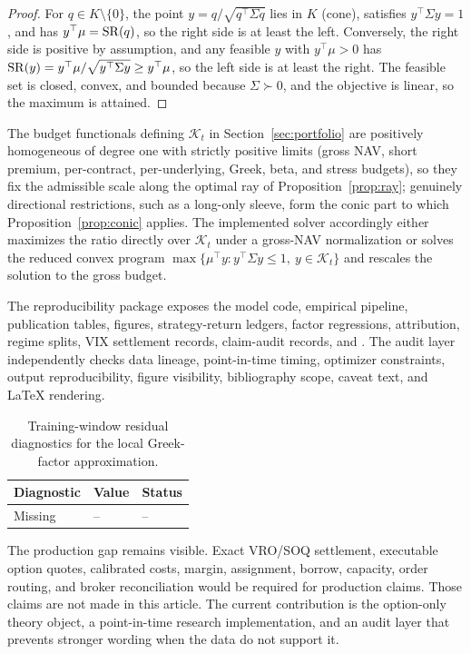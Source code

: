 \begin{proof}
For \(q\in K\setminus\{0\}\), the point \(y=q/\sqrt{q^\top\Sigma q}\) lies in \(K\)
(cone), satisfies \(y^\top\Sigma y=1\), and has \(y^\top\mu=\operatorname{SR}(q)\), so the right side is
at least the left. Conversely, the right side is positive by assumption, and any feasible
\(y\) with \(y^\top\mu>0\) has
\(\operatorname{SR}(y)=y^\top\mu/\sqrt{y^\top\Sigma y}\ge y^\top\mu\), so the left side is at least the
right. The feasible set is closed, convex, and bounded because \(\Sigma\succ0\), and the
objective is linear, so the maximum is attained.
\end{proof}

The budget functionals defining \(\mathcal K_t\) in Section~\ref{sec:portfolio} are positively homogeneous
of degree one with strictly positive limits (gross NAV, short premium, per-contract,
per-underlying, Greek, beta, and stress budgets), so they fix the admissible scale along
the optimal ray of Proposition~\ref{prop:ray}; genuinely directional restrictions, such as
a long-only sleeve, form the conic part to which Proposition~\ref{prop:conic} applies. The
implemented solver accordingly either maximizes the ratio directly over \(\mathcal K_t\)
under a gross-NAV normalization or solves the reduced convex program
\(\max\{\mu^\top y: y^\top\Sigma y\le1,\ y\in\mathcal K_t\}\) and rescales the solution to
the gross budget.

The reproducibility package exposes the model code, empirical pipeline, publication tables,
figures, strategy-return ledgers, factor regressions, attribution, regime splits, VIX
settlement records, claim-audit records, and . The audit
layer independently checks data lineage, point-in-time timing, optimizer constraints, output
reproducibility, figure visibility, bibliography scope, caveat text, and LaTeX rendering.

\begin{table}[H]
\centering
\small
{}
  {}
  {\begin{tabular}{lll}\toprule Diagnostic & Value & Status \\\midrule Missing & -- & -- \\\bottomrule\end{tabular}}
\caption{Training-window residual diagnostics for the local Greek-factor approximation.}
\label{tab:approx_app}
\end{table}

The production gap remains visible. Exact VRO/SOQ settlement, executable option quotes,
calibrated costs, margin, assignment, borrow, capacity, order routing, and broker
reconciliation would be required for production claims. Those claims are not made in this
article. The current contribution is the option-only theory object, a point-in-time research
implementation, and an audit layer that prevents stronger wording when the data do not
support it.

